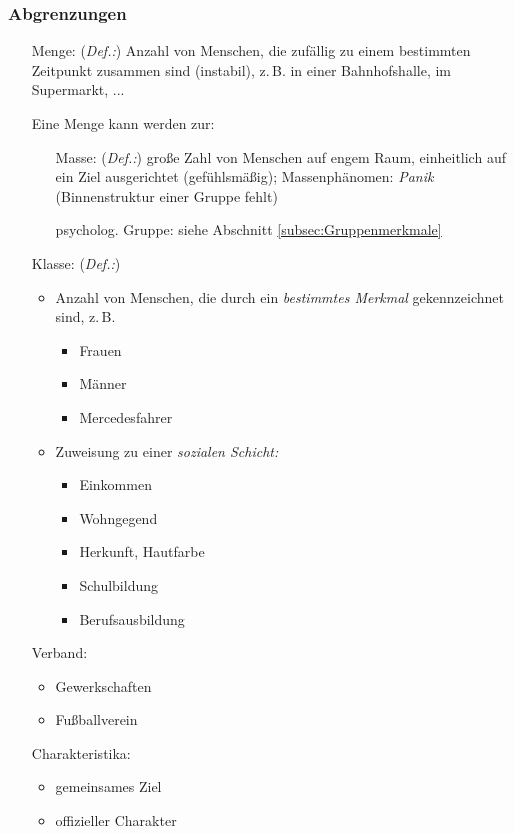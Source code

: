 \documentclass[12pt]{scrartcl}
\DeclareRobustCommand{\zB}{z.\,B.\xspace}
\begin{document}
\subsubsection{Abgrenzungen}
\begin{itemize}
	\item[Menge:] (\emph{Def.:}) Anzahl von Menschen, die zufällig zu
		einem bestimmten Zeitpunkt zusammen sind (instabil), \zB in
		einer Bahnhofshalle, im Supermarkt, ...

		Eine Menge kann werden zur:
		\begin{itemize}
			\item[Masse:] (\emph{Def.:}) große Zahl von Menschen auf
				engem Raum, einheitlich auf ein Ziel ausgerichtet
				(gefühlsmäßig); Massenphänomen: \emph{Panik} (Binnenstruktur
				einer Gruppe fehlt)
			\item[psycholog. Gruppe:] siehe Abschnitt
				\ref{subsec:Gruppenmerkmale}
		\end{itemize}
	\item[Klasse:] (\emph{Def.:})
		\begin{itemize}
			\item Anzahl von Menschen, die durch ein \emph{bestimmtes Merkmal}
				gekennzeichnet sind, \zB
				\begin{itemize}
					\item Frauen
					\item Männer
					\item Mercedesfahrer
				\end{itemize}
			\item Zuweisung zu einer \emph{sozialen Schicht:}
				\begin{itemize}
					\item Einkommen
					\item Wohngegend
					\item Herkunft, Hautfarbe
					\item Schulbildung
					\item Berufsausbildung
				\end{itemize}
		\end{itemize}
		\item[Verband:]
			\begin{itemize}
				\item Gewerkschaften
				\item Fußballverein
			\end{itemize}
			Charakteristika:
				\begin{itemize}
					\item gemeinsames Ziel
					\item offizieller Charakter
				\end{itemize}
\end{itemize}
\end{document}
